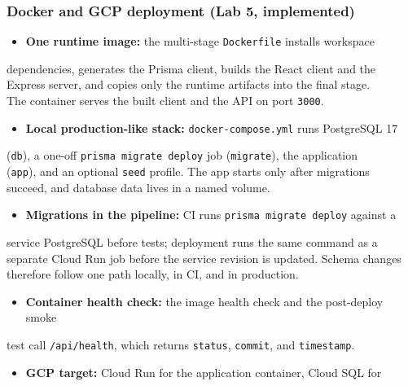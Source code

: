 \documentclass[11pt,a4paper]{article}
\begin{document}
\subsubsection{Docker and GCP deployment (Lab 5, implemented)}

\begin{itemize}[leftmargin=*,itemsep=2pt,topsep=2pt]
  \item \textbf{One runtime image:} the multi-stage \texttt{Dockerfile} installs workspace
\end{itemize}
dependencies, generates the Prisma client, builds the React client and the\\
Express server, and copies only the runtime artifacts into the final stage.\\
The container serves the built client and the API on port \texttt{3000}.\\
\begin{itemize}[leftmargin=*,itemsep=2pt,topsep=2pt]
  \item \textbf{Local production-like stack:} \texttt{docker-compose.yml} runs PostgreSQL 17
\end{itemize}
(\texttt{db}), a one-off \texttt{prisma migrate deploy} job (\texttt{migrate}), the application\\
(\texttt{app}), and an optional \texttt{seed} profile. The app starts only after migrations\\
succeed, and database data lives in a named volume.\\
\begin{itemize}[leftmargin=*,itemsep=2pt,topsep=2pt]
  \item \textbf{Migrations in the pipeline:} CI runs \texttt{prisma migrate deploy} against a
\end{itemize}
service PostgreSQL before tests; deployment runs the same command as a\\
separate Cloud Run job before the service revision is updated. Schema changes\\
therefore follow one path locally, in CI, and in production.\\
\begin{itemize}[leftmargin=*,itemsep=2pt,topsep=2pt]
  \item \textbf{Container health check:} the image health check and the post-deploy smoke
\end{itemize}
test call \texttt{/api/health}, which returns \texttt{status}, \texttt{commit}, and \texttt{timestamp}.\\
\begin{itemize}[leftmargin=*,itemsep=2pt,topsep=2pt]
  \item \textbf{GCP target:} Cloud Run for the application container, Cloud SQL for
\end{itemize}
\end{document}
